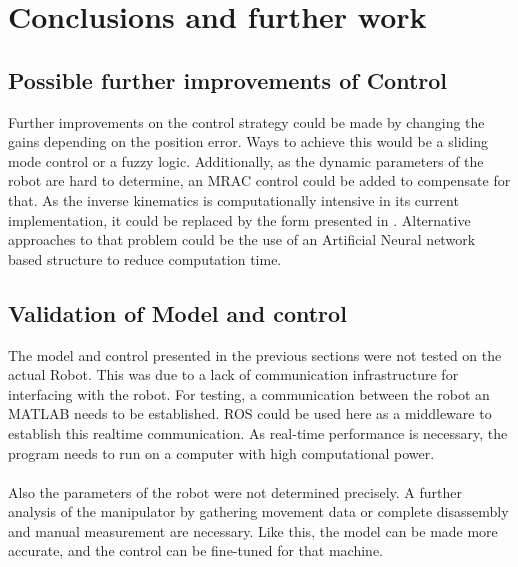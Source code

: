 \chapter{Conclusions and further work}



\section{Possible further improvements of Control}
Further improvements on the control strategy could be made by changing the gains depending on the position error. Ways to achieve this would be a sliding mode control or a fuzzy logic. Additionally, as the dynamic parameters of the robot are hard to determine, an MRAC control could be added to compensate for that. 
As the inverse kinematics is computationally intensive in its current implementation, it could be replaced by the form presented in . Alternative approaches to that problem could be the use of an Artificial Neural network based structure to reduce computation time. 

\section{Validation of Model and control}
The model and control presented in the previous sections were not tested on the actual Robot. This was due to a lack of communication infrastructure for interfacing with the robot. For testing, a communication between the robot an MATLAB needs to be established. \ac{ROS} could be used here as a middleware to establish this realtime communication. As real-time performance is necessary, the program needs to run on a computer with high computational power.\\
\\
Also the parameters of the robot were not determined precisely. A further analysis of the manipulator by gathering movement data or complete disassembly and manual measurement are necessary. Like this, the model can be made more accurate, and the control can be fine-tuned for that machine.\\
\\



